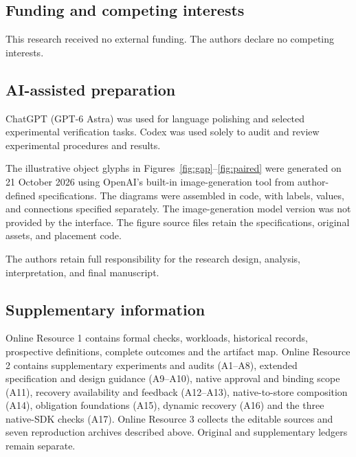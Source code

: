 \documentclass[pdflatex,sn-basic]{sn-jnl}
\begin{document}
\subsection*{Funding and competing interests}
This research received no external funding. The authors declare no competing interests.

\subsection*{AI-assisted preparation}
ChatGPT (GPT-6 Astra) was used for language polishing and selected experimental verification tasks. Codex was used solely to audit and review experimental procedures and results.

The illustrative object glyphs in Figures~\ref{fig:gap}--\ref{fig:paired} were generated on 21 October 2026 using OpenAI's built-in image-generation tool from author-defined specifications. The diagrams were assembled in code, with labels, values, and connections specified separately. The image-generation model version was not provided by the interface. The figure source files retain the specifications, original assets, and placement code.

The authors retain full responsibility for the research design, analysis, interpretation, and final manuscript.

\subsection*{Supplementary information}
Online Resource 1 contains formal checks, workloads, historical records, prospective definitions, complete outcomes and the artifact map. Online Resource 2 contains supplementary experiments and audits (A1--A8), extended specification and design guidance (A9--A10), native approval and binding scope (A11), recovery availability and feedback (A12--A13), native-to-store composition (A14), obligation foundations (A15), dynamic recovery (A16) and the three native-SDK checks (A17). Online Resource 3 collects the editable sources and seven reproduction archives described above. Original and supplementary ledgers remain separate.


\end{document}
